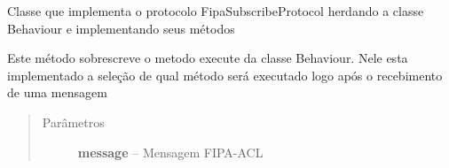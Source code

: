 \documentclass[letterpaper,10pt,brazil]{sphinxmanual}
\begin{document}
\begin{fulllineitems}
\label{api:pade.behaviours.protocols.FipaSubscribeProtocol}
Classe que implementa o protocolo FipaSubscribeProtocol
herdando a classe Behaviour e implementando seus métodos

\begin{fulllineitems}
\label{api:pade.behaviours.protocols.FipaSubscribeProtocol.deregister}
\end{fulllineitems}


\begin{fulllineitems}
\label{api:pade.behaviours.protocols.FipaSubscribeProtocol.execute}
Este método sobrescreve o metodo execute da classe 
Behaviour. Nele esta implementado a seleção de qual
método será executado logo após o recebimento de uma
mensagem
\begin{quote}\begin{description}
\item[{Parâmetros}] \leavevmode
\textbf{message} -- Mensagem FIPA-ACL

\end{description}\end{quote}

\end{fulllineitems}


\begin{fulllineitems}
\label{api:pade.behaviours.protocols.FipaSubscribeProtocol.handle_agree}
\end{fulllineitems}


\begin{fulllineitems}
\label{api:pade.behaviours.protocols.FipaSubscribeProtocol.handle_cancel}
\end{fulllineitems}


\end{fulllineitems}
\end{document}
